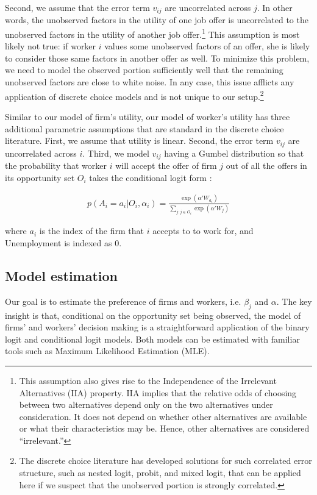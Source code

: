 Second, we assume that the error term $v_{ij}$ are uncorrelated across $j$. In
other words, the unobserved factors in the utility of one job offer is
uncorrelated to the unobserved factors in the utility of another job
offer.\footnote{This assumption also gives rise to the Independence of the
  Irrelevant Alternatives (IIA) property. IIA implies that the relative odds of
  choosing between two alternatives depend only on the two alternatives under
  consideration. It does not depend on whether other alternatives are available
  or what their characteristics may be. Hence, other alternatives are considered
  ``irrelevant.''} This assumption is most likely not true: if worker $i$ values
some unobserved factors of an offer, she is likely to consider those same
factors in another offer as well. To minimize this problem, we need to model the
observed portion sufficiently well that the remaining unobserved factors are
close to white noise. In any case, this issue afflicts any application of
discrete choice models and is not unique to our setup.\footnote{The discrete
  choice literature has developed solutions for such correlated error structure,
  such as nested logit, probit, and mixed logit, that can be applied here if we
  suspect that the unobserved portion is strongly correlated.}

Similar to our model of firm's utility, our model of worker's utility has three
additional parametric assumptions that are standard in the discrete choice
literature. First, we assume that utility is linear. Second, the error term
$v_{ij}$ are uncorrelated across $i$. Third, we model $v_{ij}$ having a Gumbel
distribution so that the probability that worker $i$ will accept the offer of
firm $j$ out of all the offers in its opportunity set $O_i$ takes the
conditional logit form \citep{Cameron2005}:

\begin{align}
  p(A_i = a_i | O_i, \alpha_i) = \frac{\exp(\alpha'W_{a_i})}{\sum\limits_{j:j \in O_i} \exp(\alpha'W_j)} \label{eq:conditional_probability_of_accept}
\end{align}

where $a_i$ is the index of the firm that $i$ accepts to to work for, and
Unemployment is indexed as 0.

\subsection{Model estimation}

Our goal is to estimate the preference of firms and workers, i.e. $\beta_j$ and
$\alpha$. The key insight is that, conditional on the opportunity set being
observed, the model of firms' and workers' decision making is a straightforward
application of the binary logit and conditional logit models. Both models can be
estimated with familiar tools such as Maximum Likelihood Estimation (MLE).


